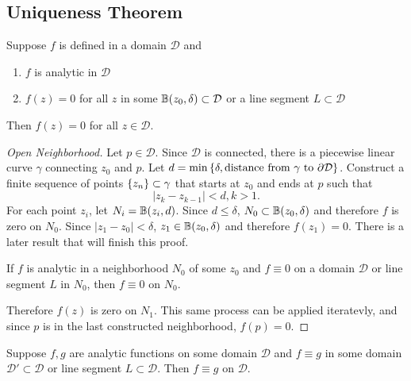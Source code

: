 \documentclass[../notes.tex]{subfiles}
\begin{document}

\subsubsection{} %

\subsection{Uniqueness Theorem}

\begin{theorem}
    Suppose $f$ is defined in a domain $\mathcal{D}$ and
    \begin{enumerate}
        \item $f$ is analytic in $\mathcal{D}$
        \item $f(z) = 0$ for all $z$ in some $\mathbb{B}\qty(z_0, \delta) \subset \mathcal{D}$ or a line segment $L \subset\mathcal{D}$
    \end{enumerate}
    Then $f(z) = 0$ for all $z \in \mathcal{D}$.
\end{theorem}
\begin{proof}[Open Neighborhood]
    Let $p \in \mathcal{D}$. Since $\mathcal{D}$ is connected, there is a piecewise linear curve $\gamma$ connecting $z_0$ and $p$. Let $ d = \min\qty{\delta, \text{distance from }\gamma\text{ to }\partial\mathcal{D}}$. Construct a finite sequence of points $\qty{z_n} \subset \gamma$ that starts at $z_0$ and ends at $p$ such that
    \[
        |z_k - z_{k-1}| < d, k > 1
    .\]
    For each point $z_i$, let $N_i = \mathbb{B}\qty(z_i, d)$. Since $d \leq \delta$, $N_0 \subset \mathbb{B}\qty(z_0, \delta)$ and therefore $f$ is zero on $N_0$. Since $|z_1 - z_0| < \delta$, $z_1 \in \mathbb{B}\qty(z_0, \delta)$ and therefore $f(z_1) = 0$. There is a later result that will finish this proof.

    \begin{theorem}
        If $f$ is analytic in a neighborhood $N_0$ of some $z_0$ and $f \equiv 0$ on a domain $\mathcal{D}$ or line segment $L$ in $N_0$, then $f \equiv 0$ on $N_0$.
    \end{theorem}

    Therefore $f(z)$ is zero on $N_1$. This same process can be applied iteratevly, and since $p$ is in the last constructed neighborhood, $f(p) = 0$.
\end{proof}

\begin{corollary}
    Suppose $f,g$ are analytic functions on some domain $\mathcal{D}$ and $f \equiv g$ in some domain $\mathcal{D}' \subset \mathcal{D}$ or line segment $L \subset \mathcal{D}$. Then $f \equiv g$ on $\mathcal{D}$.
\end{corollary}
\end{document}
